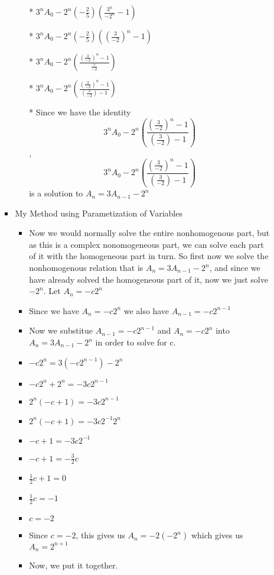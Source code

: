 \documentclass{article}
\begin{document}
\begin{enumerate}
\begin{enumerate}
\begin{itemize}
\begin{itemize}
      \item [*] $3^{n}A_{0} -2^{n}(-\frac{2}{5})\left(\frac{3^{n}}{-2^{n}}-1\right)$
      \item [*] $3^{n}A_{0} -2^{n}(-\frac{2}{5})\left(\left(\frac{3}{-2}\right)^{n}-1\right)$
      \item [*] $3^{n}A_{0} -2^{n}\left(\frac{\left(\frac{3}{-2}\right)^{n}-1}{\frac{5}{-2}}\right)$
      \item [*] $3^{n}A_{0} -2^{n}\left(\frac{\left(\frac{3}{-2}\right)^{n}-1}{\left(\frac{3}{-2}\right)-1}\right)$
      \item [*] Since we have the identity $$3^{n}A_{0} -2^{n}\left(\frac{\left(\frac{3}{-2}\right)^{n}-1}{\left(\frac{3}{-2}\right)-1}\right)$$, $$3^{n}A_{0} -2^{n}\left(\frac{\left(\frac{3}{-2}\right)^{n}-1}{\left(\frac{3}{-2}\right)-1}\right)$$ is a solution to $A_{n}=3A_{n-1}-2^{n}$
      \end{itemize} %
    \item My Method using Parametization of Variables
      \begin{itemize} %
      \item Now we would normally solve the entire nonhomogenous part, but as this is a complex nonomogeneous part, we can solve each part of it with the homogeneous part in turn. So first now we solve the nonhomogenous relation that is $A_{n}=3A_{n-1}-2^{n}$, and since we have already solved the homogeneous part of it, now we just solve $-2^{n}$. Let $A_{n}=-c2^{n}$
      \item Since we have $A_{n}=-c2^{n}$ we also have $A_{n-1}=-c2^{n-1}$
      \item Now we substitue $A_{n-1}=-c2^{n-1}$ and $A_{n}=-c2^{n}$ into $A_{n}=3A_{n-1}-2^{n}$ in order to solve for c.
      \item $-c2^{n}=3(-c2^{n-1})-2^{n}$
      \item $-c2^{n}+2^{n}=-3c2^{n-1}$
      \item $2^{n}(-c+1)=-3c2^{n-1}$
      \item $2^{n}(-c+1)=-3c2^{-1}2^{n}$
      \item $-c+1=-3c2^{-1}$
      \item $-c+1=-\frac{3}{2}c$
      \item $\frac{1}{2}c+1=0$
      \item $\frac{1}{2}c=-1$
      \item $c=-2$
      \item Since $c=-2$, this gives us $A_{n}=-2(-2^{n})$ which gives us $A_{n}=2^{n+1}$
      \item Now, we put it together.

\end{itemize}
\end{itemize}
\end{enumerate}
\end{enumerate}
\end{document}
